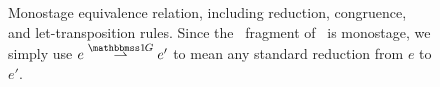 \begin{figure}[t]
\begin{abstrsyn}
\begin{mathpar}
\end{mathpar}
\end{abstrsyn}
\caption{Monostage equivalence relation, including reduction, congruence, and let-transposition rules. Since the \bbonep\ fragment of \lang\ is monostage, we simply use $e \betastepsym \bbonep e'$ to mean any standard reduction from $e$ to $e'$.}
\label{fig:equiv}
\end{figure}
